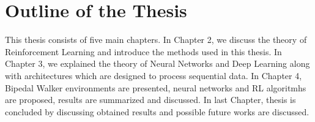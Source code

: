 \section{Outline of the Thesis}
\label{sec:outline}
This thesis consists of five main chapters. 
In Chapter 2, we discuss the theory of Reinforcement Learning and introduce the methods used in this thesis.
In Chapter 3, we explained the theory of Neural Networks and Deep Learning along with architectures which are designed to process sequential data. 
In Chapter 4, Bipedal Walker environments are presented, neural networks and RL algoritmhs are proposed, results are summarized and discussed.
In last Chapter, thesis is concluded by discussing obtained results and possible future works are discussed. 
